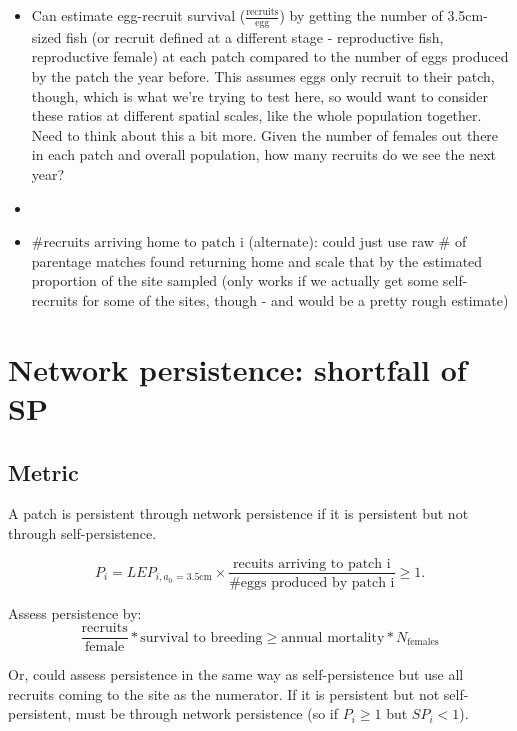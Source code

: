 \documentclass[12pt, oneside]{article}   	%
\begin{document}
\begin{itemize}
\item Can estimate egg-recruit survival ($\frac{\text{recruits}}{\text{egg}}$) by getting the number of 3.5cm-sized fish (or recruit defined at a different stage - reproductive fish, reproductive female) at each patch compared to the number of eggs produced by the patch the year before. This assumes eggs only recruit to their patch, though, which is what we're trying to test here, so would want to consider these ratios at different spatial scales, like the whole population together. Need to think about this a bit more. Given the number of females out there in each patch and overall population, how many recruits do we see the next year?
\item 
\item $\# \text{recruits arriving home to patch i}$ (alternate): could just use raw \# of parentage matches found returning home and scale that by the estimated proportion of the site sampled (only works if we actually get some self-recruits for some of the sites, though - and would be a pretty rough estimate)
\end{itemize}

\section*{Network persistence: shortfall of SP}
\subsection*{Metric}
A patch is persistent through network persistence if it is persistent but not through self-persistence.

\begin{equation}
P_i = LEP_{i, \text{$a_0$ = 3.5cm}} \times \frac{\text{recuits arriving to patch i}}{\# \text{eggs produced by patch i}} \geq 1. %
\end{equation}

Assess persistence by:
\begin{equation}
\frac{\text{recruits}}{\text{female}}*\text{survival to breeding} \geq \text{annual mortality}*N_{\text{females}}
\end{equation}

Or, could assess persistence in the same way as self-persistence but use all recruits coming to the site as the numerator. If it is persistent but not self-persistent, must be through network persistence (so if $P_i \geq 1$ but $SP_i < 1$).
\end{document}
